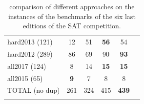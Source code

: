 \begin{table}[t]
{{\begin{tabular}{l|ccccc}
				hard2013 (121) & 12 & 51 & \cellcolor{gray!30}\textbf{56} & 54\\
				hard2012 (289) & 86 & 69 & 90 & \cellcolor{gray!30}\textbf{93}\\
				\hline
				all2017 (124) & 8 & 14 & \cellcolor{gray!30}\textbf{15} & \cellcolor{gray!30}\textbf{15}\\
				all2015 (65) & \cellcolor{gray!30}\textbf{9} & 7 & 8 & 8\\
				\hline
				TOTAL (no dup) & 261 & 324 & 415 & \cellcolor{gray!30}\textbf{439}\\
				\label{table:unsat:bliss}
			\end{tabular}
		}
	}
	\vspace*{0.1cm}
	\caption{comparison of different approaches on the \unsat instances of the benchmarks of the six last editions of the SAT competition.}
	\label{table:benchUNSAT}
\end{table}

